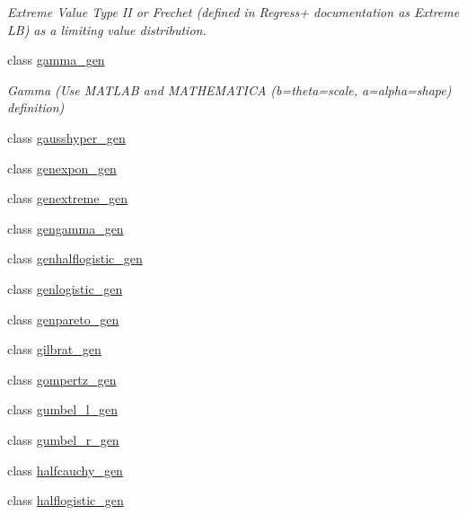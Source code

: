 \begin{DoxyCompactItemize}
\begin{DoxyCompactList}\small\item\em Extreme Value Type I\+I or Frechet (defined in Regress+ documentation as Extreme L\+B) as a limiting value distribution. \end{DoxyCompactList}\item 
class \hyperlink{classscipy_1_1stats_1_1__continuous__distns_1_1gamma__gen}{gamma\+\_\+gen}
\begin{DoxyCompactList}\small\item\em Gamma (Use M\+A\+T\+L\+A\+B and M\+A\+T\+H\+E\+M\+A\+T\+I\+C\+A (b=theta=scale, a=alpha=shape) definition) \end{DoxyCompactList}\item 
class \hyperlink{classscipy_1_1stats_1_1__continuous__distns_1_1gausshyper__gen}{gausshyper\+\_\+gen}
\item 
class \hyperlink{classscipy_1_1stats_1_1__continuous__distns_1_1genexpon__gen}{genexpon\+\_\+gen}
\item 
class \hyperlink{classscipy_1_1stats_1_1__continuous__distns_1_1genextreme__gen}{genextreme\+\_\+gen}
\item 
class \hyperlink{classscipy_1_1stats_1_1__continuous__distns_1_1gengamma__gen}{gengamma\+\_\+gen}
\item 
class \hyperlink{classscipy_1_1stats_1_1__continuous__distns_1_1genhalflogistic__gen}{genhalflogistic\+\_\+gen}
\item 
class \hyperlink{classscipy_1_1stats_1_1__continuous__distns_1_1genlogistic__gen}{genlogistic\+\_\+gen}
\item 
class \hyperlink{classscipy_1_1stats_1_1__continuous__distns_1_1genpareto__gen}{genpareto\+\_\+gen}
\item 
class \hyperlink{classscipy_1_1stats_1_1__continuous__distns_1_1gilbrat__gen}{gilbrat\+\_\+gen}
\item 
class \hyperlink{classscipy_1_1stats_1_1__continuous__distns_1_1gompertz__gen}{gompertz\+\_\+gen}
\item 
class \hyperlink{classscipy_1_1stats_1_1__continuous__distns_1_1gumbel__l__gen}{gumbel\+\_\+l\+\_\+gen}
\item 
class \hyperlink{classscipy_1_1stats_1_1__continuous__distns_1_1gumbel__r__gen}{gumbel\+\_\+r\+\_\+gen}
\item 
class \hyperlink{classscipy_1_1stats_1_1__continuous__distns_1_1halfcauchy__gen}{halfcauchy\+\_\+gen}
\item 
class \hyperlink{classscipy_1_1stats_1_1__continuous__distns_1_1halflogistic__gen}{halflogistic\+\_\+gen}

\end{DoxyCompactItemize}
